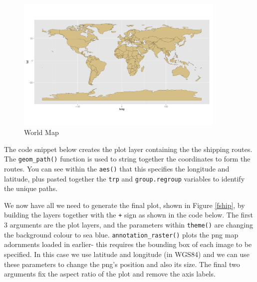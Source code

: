 \documentclass[]{article}
\newenvironment{Shaded}{}{}
\newcommand{\KeywordTok}[1]{\textcolor[rgb]{0.00,0.44,0.13}{\textbf{{#1}}}}
\newcommand{\DataTypeTok}[1]{\textcolor[rgb]{0.56,0.13,0.00}{{#1}}}
\newcommand{\FloatTok}[1]{\textcolor[rgb]{0.25,0.63,0.44}{{#1}}}
\newcommand{\StringTok}[1]{\textcolor[rgb]{0.25,0.44,0.63}{{#1}}}
\newcommand{\NormalTok}[1]{{#1}}
\let\Oldincludegraphics\includegraphics
\renewcommand{\includegraphics}[1]{\Oldincludegraphics[width=10cm]{#1}}
\begin{document}
\begin{figure}[htbp]
\centering
\includegraphics{figs/World_Map}
\caption{World Map}
\end{figure}

The code snippet below creates the plot layer containing the the
shipping routes. The \texttt{geom\_path()} function is used to string
together the coordinates to form the routes. You can see within the
\texttt{aes()} that this specifies the longitude and latitude, plus pasted
together the \texttt{trp} and \texttt{group.regroup} variables to
identify the unique paths.

\begin{Shaded}
\end{Shaded}

We now have all we need to generate the final plot, shown in Figure \ref{fship}, by building the
layers together with the \texttt{+} sign as shown in the code below. The
first 3 arguments are the plot layers, and the parameters within
\texttt{theme()} are changing the background colour to sea blue.
\texttt{annotation\_raster()} plots the png map adornments loaded in
earlier- this requires the bounding box of each image to be specified.
In this case we use latitude and longitude (in WGS84) and we can use
these parameters to change the png's position and also its size. The
final two arguments fix the aspect ratio of the plot and remove the axis
labels.
\end{document}
